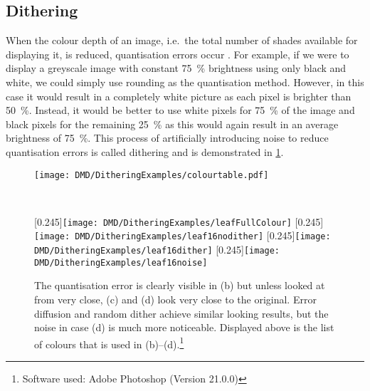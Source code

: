 \subsection{Dithering}
When the colour depth of an image, i.e.\ the total number of shades available for displaying it, is reduced, quantisation errors occur \cite{funkhouser:2000}. For example, if we were to display a greyscale image with constant \SI{75}{\percent} brightness using only black and white, we could simply use rounding as the quantisation method. However, in this case it would result in a completely white picture as each pixel is brighter than \SI{50}{\percent}. Instead, it would be better to use white pixels for \SI{75}{\percent} of the image and black pixels for the remaining \SI{25}{\percent} as this would again result in an average brightness of \SI{75}{\percent}. This process of artificially introducing noise to reduce quantisation errors is called dithering and is demonstrated in \cref{fig:dmd_dithering_example}. 
\begin{figure}[htbp]
    \centering
    \hfill%
    \begin{minipage}{0.748333\linewidth}
        \centering
        \texttt{[image: DMD/DitheringExamples/colourtable.pdf]}
    \end{minipage}\\[2ex]
    \begin{minipage}{1\textwidth}
        \centering
        \captionsetup[subfigure]{justification=raggedright}%
        [0.245\linewidth]{\texttt{[image: DMD/DitheringExamples/leafFullColour]}}%
        \hfill%
        [0.245\linewidth]{\texttt{[image: DMD/DitheringExamples/leaf16nodither]}}%
        \hfill%
        [0.245\linewidth]{\texttt{[image: DMD/DitheringExamples/leaf16dither]}}%
        \hfill%
        [0.245\linewidth]{\texttt{[image: DMD/DitheringExamples/leaf16noise]}}%
        \renewcommand*{\thempfootnote}{\fnsymbol{mpfootnote}}%
        \renewcommand*\footnoterule{}%
        \caption[The effect of dithering on the perceived colour depth and quality of a downsampled image]{The quantisation error is clearly visible in (b) but unless looked at from very close, (c) and (d) look very close to the original. Error diffusion and random dither achieve similar looking results, but the noise in case (d) is much more noticeable. Displayed above is the list of colours that is used in (b)--(d).\footnote{Software used: Adobe Photoshop (Version 21.0.0)}}
        \label{fig:dmd_dithering_example}
    \end{minipage}
\end{figure}
